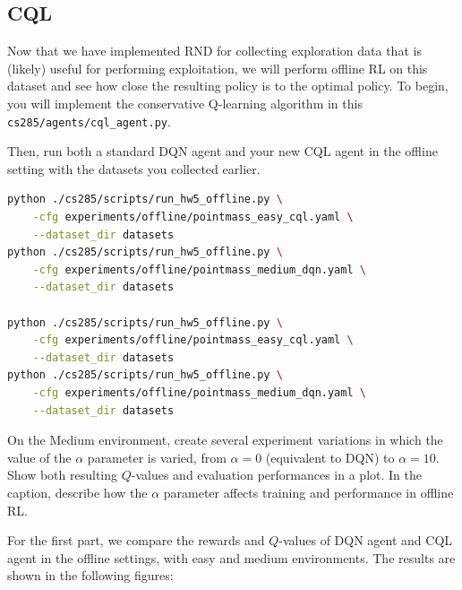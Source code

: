 \documentclass{article}
\begin{document}
\subsection{CQL}
Now that we have implemented RND for collecting exploration data that is (likely) useful for performing exploitation, we will perform offline RL on this dataset and see how close the resulting policy is to the optimal policy. To begin, you will implement the conservative Q-learning algorithm in this \verb+cs285/agents/cql_agent.py+.

Then, run both a standard DQN agent and your new CQL agent in the offline setting with the datasets you collected earlier.

\begin{lstlisting}[language=bash]
python ./cs285/scripts/run_hw5_offline.py \
    -cfg experiments/offline/pointmass_easy_cql.yaml \
    --dataset_dir datasets
python ./cs285/scripts/run_hw5_offline.py \
    -cfg experiments/offline/pointmass_medium_dqn.yaml \
    --dataset_dir datasets

python ./cs285/scripts/run_hw5_offline.py \
    -cfg experiments/offline/pointmass_easy_cql.yaml \
    --dataset_dir datasets
python ./cs285/scripts/run_hw5_offline.py \
    -cfg experiments/offline/pointmass_medium_dqn.yaml \
    --dataset_dir datasets
\end{lstlisting}

On the Medium environment, create several experiment variations in which the value of the $\alpha$ parameter is varied, from $\alpha=0$ (equivalent to DQN) to $\alpha=10$. Show both resulting $Q$-values and evaluation performances in a plot. In the caption, describe how the $\alpha$ parameter affects training and performance in offline RL.

\MYSOLUTION For the first part, we compare the rewards and $Q$-values of DQN agent and CQL agent in the offline settings, with easy and medium environments. The results are shown in the following figures:

\end{document}
